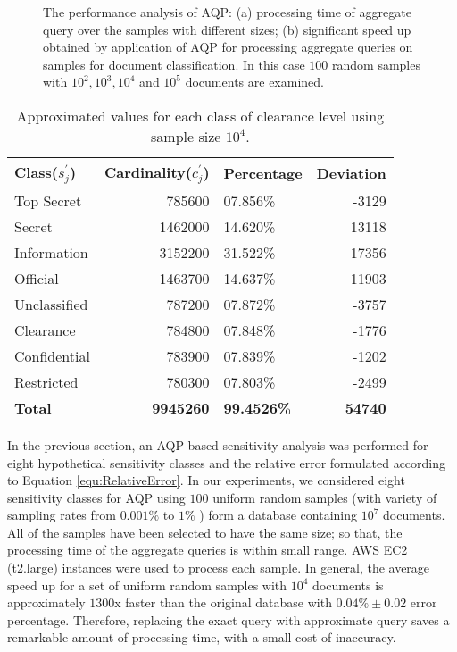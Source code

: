 \begin{figure}[H]
\begin{subfigure}{0.40\textwidth}
\centering
\resizebox{1.0\textwidth}{!}{}
\label{fig:runTime}
\caption{}
\end{subfigure}
\qquad 
\begin{subfigure}{0.5\textwidth}
\resizebox{1.0\textwidth}{!}{}
\label{fig:speedup}
\caption{}
\end{subfigure}
\caption{The performance analysis of AQP: (a) processing time of aggregate query over the samples with different sizes; (b) significant speed up obtained by application of AQP for processing aggregate queries on samples for document classification. In this case $100$ random samples with $10^2, 10^3, 10^4$ and $10^5$ documents are examined.}
\label{fig:performance}
\end{figure}

\begin{table*}[h!]
\caption{Approximated values for each class of clearance level using sample size $10^4$.}
\label{tab:AproximatedDocumentClass}
\centering
\begin{tabular}{lrlr}
\toprule
\textbf{Class($s_j^\prime$)} & \textbf{Cardinality($c_j^\prime$)} & \textbf{Percentage} & \textbf{Deviation}\\
\midrule
Top Secret  & 785600  & 07.856\%   & -3129  \\ 
Secret      & 1462000 & 14.620\%   & 13118\\
Information & 3152200 & 31.522\%   & -17356\\
Official    & 1463700 & 14.637\%   & 11903 \\
Unclassified& 787200  & 07.872\%   & -3757 \\
Clearance   & 784800  & 07.848\%   & -1776 \\
Confidential& 783900  & 07.839\%   & -1202  \\
Restricted  & 780300  & 07.803\%   & -2499\\
\midrule
\textbf{Total}  & \textbf{9945260}  & \textbf{99.4526\%} & \textbf{54740}\\
\bottomrule
\end{tabular}
\end{table*}


 In the previous section, an AQP-based sensitivity analysis was performed for eight hypothetical sensitivity classes and the relative error formulated according to Equation \ref{equ:RelativeError}. In our experiments, we considered eight sensitivity classes for AQP using $100$ uniform random samples (with variety of sampling rates from $0.001\%$  to $1\%$ ) form a database containing  $10^7$ documents. All of the samples have been selected to have the same size; so that, the processing time of the aggregate queries is within small range. AWS EC2 (t2.large) instances were used to process each sample. In general, the average speed up for a set of uniform random samples with $10^4$ documents is approximately $1300$x faster than the original database with $0.04\% \pm 0.02$ error percentage. Therefore, replacing the exact query with approximate query saves a remarkable amount of processing time, with a small cost of inaccuracy.

